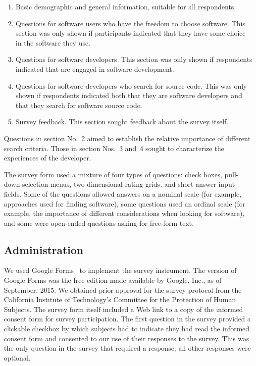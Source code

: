 \documentclass{casicswhitepaper}
\begin{document}
\begin{enumerate}

\item Basic demographic and general information, suitable for all respondents.

\item Questions for software users who have the freedom to choose software.  This section was only shown if participants indicated that they have some choice in the software they use.

\item Questions for software developers.  This section was only shown if respondents indicated that are engaged in software development.

\item Questions for software developers who search for source code.  This was only shown if respondents indicated both that they are software developers and that they search for software source code.

\item Survey feedback.  This section sought feedback about the survey itself.

\end{enumerate}

Questions in section No.~2 aimed to establish the relative importance of different search criteria.  Those in section Nos.~3 and~4 sought to characterize the experiences of the developer.

The survey form used a mixture of four types of questions: check boxes, pull-down selection menus, two-dimensional rating grids, and short-answer input fields.  Some of the questions allowed answers on a nominal scale (for example, approaches used for finding software), some questions used an ordinal scale (for example, the importance of different considerations when looking for software), and some were open-ended questions asking for free-form text.


\subsection{Administration}

We used Google Forms~\cite{googleforms} to implement the survey instrument.  The version of Google Forms was the free edition made available by Google, Inc., as of September, 2015.  We obtained prior approval for the survey protocol from the California Institute of Technology's Committee for the Protection of Human Subjects.  The survey form itself included a Web link to a copy of the informed consent form for survey participation.  The first question in the survey provided a clickable checkbox by which subjects had to indicate they had read the informed consent form and consented to our use of their responses to the survey.  This was the only question in the survey that required a response; all other responses were optional.
\end{document}
